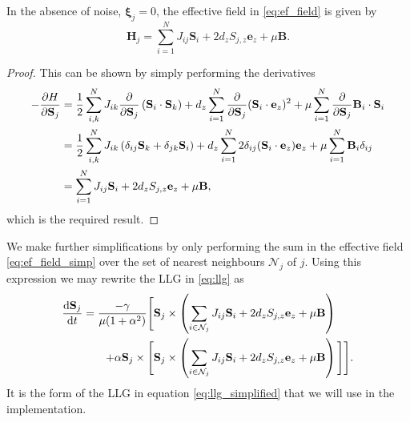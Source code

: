 \begin{prop}
	In the absence of noise, $\boldsymbol{\xi}_j = 0$, the effective field in \eqref{eq:ef_field} is given by
	\begin{equation}\label{eq:ef_field_simp}
		\mathbf{H}_j = \sum_{i=1}^{N} J_{ij} \mathbf{S}_i + 2d_z S_{j,z} \mathbf{e}_z + \mu \mathbf{B}.
	\end{equation}
\end{prop}
\begin{proof}
This can be shown by simply performing the derivatives 
\begin{align*}
	-\frac{\partial H}{\partial \mathbf{S}_j} &= \frac{1}{2}\sum_{i,k}^{N} J_{ik} \frac{\partial}{\partial \mathbf{S}_j} \left( \mathbf{S}_i \cdot \mathbf{S}_k \right) + d_z \sum_{i=1}^{N} \frac{\partial }{\partial \mathbf{S}_j}(\mathbf{S}_i \cdot \mathbf{e}_z)^2 + \mu \sum_{i=1}^{N} \frac{\partial }{\partial \mathbf{S}_j} \mathbf{B}_i \cdot \mathbf{S}_i \\
	&= \frac{1}{2}\sum_{i,k}^{N} J_{ik} \left( \delta_{ij} \mathbf{S}_k + \delta_{jk} \mathbf{S}_i \right) + d_z \sum_{i=1}^N 2 \delta_{ij} (\mathbf{S}_i \cdot \mathbf{e}_z) \mathbf{e}_z + \mu \sum_{i=1}^N \mathbf{B}_i \delta_{ij} \\
	&= \sum_{i=1}^N J_{ij} \mathbf{S}_i + 2d_z S_{j,z} \mathbf{e}_z + \mu \mathbf{B},
\end{align*}
which is the required result.
\end{proof}
We make further simplifications by only performing the sum in the effective field \eqref{eq:ef_field_simp} over the set of nearest neighbours $\mathcal{N}_j$ of $j$.
Using this expression we may rewrite the LLG in \eqref{eq:llg} as
\begin{align}\label{eq:llg_simplified}
	\frac{\text{d} \mathbf{S}_j}{\text{d} t} = \frac{-\gamma}{\mu(1 + \alpha^2)} \Bigg[ \mathbf{S}_j &\times \left( \sum_{i \in \mathcal{N}_j} J_{ij} \mathbf{S}_i + 2d_z S_{j,z} \mathbf{e}_z + \mu \mathbf{B} \right) \nonumber \\
	+ \alpha \mathbf{S}_j \times \Bigg[  \mathbf{S}_j  &\times \left( \sum_{i \in \mathcal{N}_j} J_{ij} \mathbf{S}_i + 2d_z S_{j,z} \mathbf{e}_z + \mu \mathbf{B} \right) \Bigg] \Bigg]. 
\end{align}
It is the form of the LLG in equation \ref{eq:llg_simplified} that we will use in the implementation.